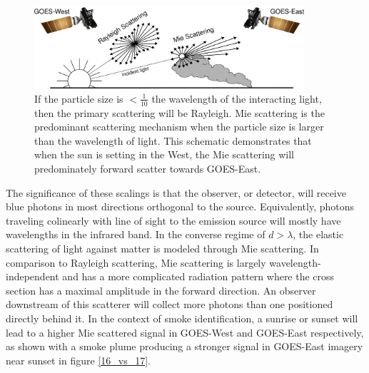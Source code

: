 \documentclass{article}
\begin{document}

\begin{figure}
    \centering
    \includegraphics[width=10cm]{figures/mei.png}
    \caption{If the particle size is \(<\frac{1}{10}\) the wavelength of the interacting light, then the primary scattering will be Rayleigh. Mie scattering is the predominant scattering mechanism when the particle size is larger than the wavelength of light. This schematic demonstrates that when the sun is setting in the West, the Mie scattering will predominately forward scatter towards GOES-East.} \label{mei}
\end{figure}

The significance of these scalings is that the observer, or detector, will receive blue photons in most directions orthogonal to the source. Equivalently, photons traveling colinearly with line of sight to the emission source will mostly have wavelengths in the infrared band. In the converse regime of \(d > \lambda\), the elastic scattering of light against matter is modeled through Mie scattering. In comparison to Rayleigh scattering, Mie scattering is largely wavelength-independent and has a more complicated radiation pattern where the cross section has a maximal amplitude in the forward direction. An observer downstream of this scatterer will collect more photons than one positioned directly behind it. In the context of smoke identification, a sunrise or sunset will lead to a higher Mie scattered signal in GOES-West and GOES-East respectively, as shown with a smoke plume producing a stronger signal in GOES-East imagery near sunset in figure \ref{16_vs_17}.
\end{document}
